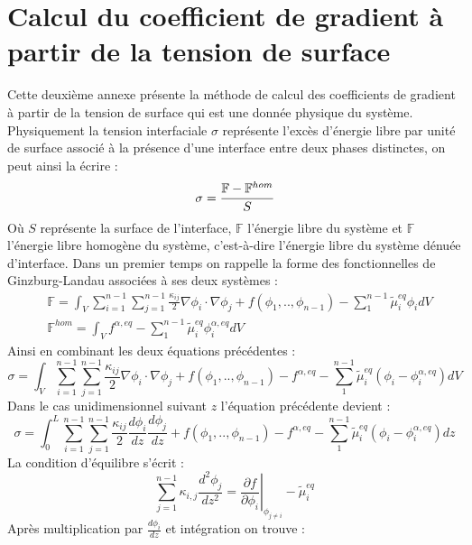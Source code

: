 
\chapter{Calcul du coefficient de gradient à partir de la tension de surface}
Cette deuxième annexe présente la méthode de calcul des coefficients de gradient à partir de la tension de surface qui est une donnée physique du système. Physiquement la tension interfaciale $\sigma$ représente l'excès d'énergie libre par unité de surface associé à la présence d'une interface entre deux phases distinctes, on peut ainsi la écrire :
\begin{equation}
\sigma = \cfrac{\mathbb{F}-\mathbb{F}^{hom}}{S}
\end{equation}
Où $S$ représente la surface de l'interface, $\mathbb{F}$ l'énergie libre du système et $\mathbb{F}$ l'énergie libre homogène du système, c'est-à-dire l'énergie libre du système dénuée d'interface. 
Dans un premier temps on rappelle la forme des fonctionnelles de Ginzburg-Landau associées à ses deux systèmes :
\begin{align*}
&\mathbb{F} = \int_{V}\sum_{i=1}^{n-1}\sum_{j=1}^{n-1}\frac{\kappa_{ij}}{2}\nabla \phi_i \cdot \nabla \phi_j + f(\phi_1,..,\phi_{n-1}) - \sum_{1}^{n-1}\tilde{\mu}_i^{eq}\phi_i dV \\
&\mathbb{F}^{hom} = \int_V f^{\alpha,eq}  - \sum_{1}^{n-1}\tilde{\mu}_i^{eq}\phi_i^{\alpha,eq} dV 
\end{align*}
Ainsi en combinant les deux équations précédentes : 
\begin{equation}
\sigma = \int_{V}\sum_{i=1}^{n-1}\sum_{j=1}^{n-1}\frac{\kappa_{ij}}{2}\nabla \phi_i \cdot \nabla \phi_j + f(\phi_1,..,\phi_{n-1}) - f^{\alpha,eq} - \sum_{1}^{n-1}\tilde{\mu}_i^{eq}(\phi_i-\phi_i^{\alpha,eq}) dV
\end{equation}
Dans le cas unidimensionnel suivant $z$ l'équation précédente devient : 
\begin{equation}
\sigma = \int_{0}^L\sum_{i=1}^{n-1}\sum_{j=1}^{n-1}\frac{\kappa_{ij}}{2}\frac{ d\phi_i}{dz} \frac{ d\phi_j}{dz} + f(\phi_1,..,\phi_{n-1}) - f^{\alpha,eq} - \sum_{1}^{n-1}\tilde{\mu}_i^{eq}(\phi_i-\phi_i^{\alpha,eq}) dz
\end{equation}
La condition d'équilibre s'écrit :
\begin{equation}
\sum_{j=1}^{n-1} \kappa_{i,j} \frac{d^2\phi_j}{dz^2} = \left.\frac{\partial f}{\partial \phi_i}\right|_{\phi_{j\neq i}} - \tilde{\mu}_i^{eq}
\end{equation}
Après multiplication par $\displaystyle \frac{d\phi_i}{dz}$ et intégration on trouve :
